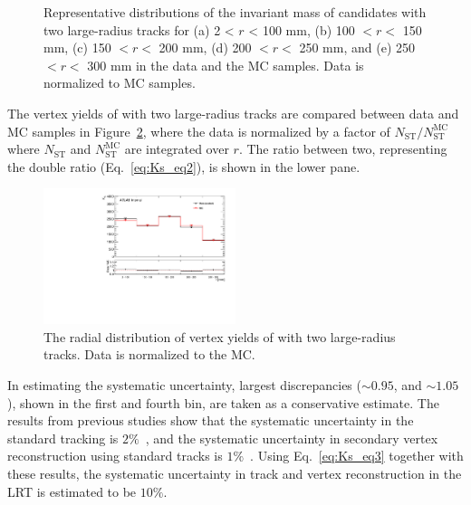 \begin{figure}[!htb]
    \caption{Representative distributions of the invariant mass of \Ks candidates with two large-radius tracks for (a) 2 < $r$ < 100 mm, (b) 100 $<r<$ 150 mm, (c) 150 $<r<$ 200 mm, (d) 200 $<r<$ 250 mm, and (e) 250 $<r<$ 300 mm in the data and the MC samples. Data is normalized to MC samples.}
    \label{fig:Ks_mass}
\end{figure}

The vertex yields of \Ks with two large-radius tracks are compared between data and MC samples in Figure~\ref{fig:Ks_double_ratio}, where the data is normalized by a factor of $N_{\mathrm{ST}} / N_{\mathrm{ST}}^{\mathrm{MC}}$ where $N_{\mathrm{ST}}$ and $N_{\mathrm{ST}}^{\mathrm{MC}}$ are integrated over $r$. The ratio between two, representing the double ratio (Eq.~\ref{eq:Ks_eq2}), is shown in the lower pane.

\begin{figure}[!htb]
	\includegraphics[width=0.50\textwidth]{figures/m_syst_Ks_ratio_R.pdf}
	\centering
	\caption{The radial distribution of vertex yields of \Ks with two large-radius tracks. Data is normalized to the MC.} %
	\label{fig:Ks_double_ratio}
\end{figure}

In estimating the systematic uncertainty, largest discrepancies ($\sim0.95$, and $\sim1.05$), shown in the first and fourth bin, are taken as a conservative estimate. The results from previous studies show that the systematic uncertainty in the standard tracking is $2\%$~\cite{ATL-PHYS-PUB-2015-051}, and the systematic uncertainty in secondary vertex reconstruction using standard tracks is $1\%$~\cite{Aaboud:2215485}. Using Eq.~\ref{eq:Ks_eq3} together with these results, the systematic uncertainty in track and vertex reconstruction in the LRT is estimated to be $10\%$.




















